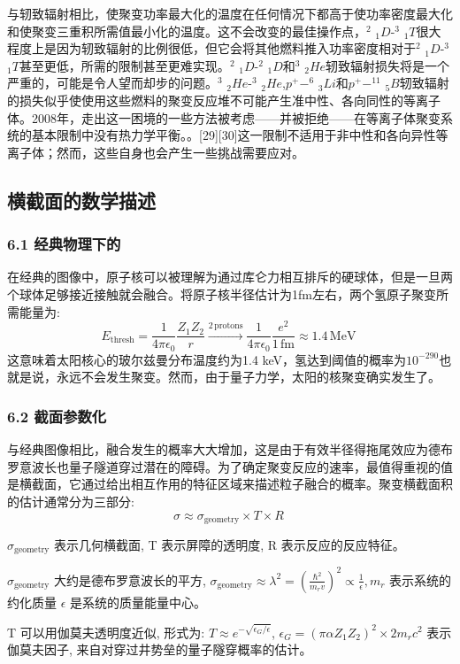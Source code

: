 与轫致辐射相比，使聚变功率最大化的温度在任何情况下都高于使功率密度最大化和使聚变三重积所需值最小化的温度。这不会改变的最佳操作点，$^{2}$ $_{1}D$-$^{3}$ $_{1}T$很大程度上是因为轫致辐射的比例很低，但它会将其他燃料推入功率密度相对于$^{2}$ $_{1}D$-$^{3}$ $_{1}T$甚至更低，所需的限制甚至更难实现。$^{2}$ $_{1}D$-$^{2}$ $_{1}D$和$^{3}$ $_{2}He$轫致辐射损失将是一个严重的，可能是令人望而却步的问题。$^{3}$ $_{2}He$-$^{3}$ $_{2}He$,$p^{+}-^{6}$ $_{3}Li$和$p^{+}-^{11}$ $_{5}B$轫致辐射的损失似乎使使用这些燃料的聚变反应堆不可能产生准中性、各向同性的等离子体。2008年，走出这一困境的一些方法被考虑——并被拒绝——在等离子体聚变系统的基本限制中没有热力学平衡。。[29][30]这一限制不适用于非中性和各向异性等离子体；然而，这些自身也会产生一些挑战需要应对。

\subsection{ 横截面的数学描述}
\subsubsection{6.1 经典物理下的}
在经典的图像中，原子核可以被理解为通过库仑力相互排斥的硬球体，但是一旦两个球体足够接近接触就会融合。将原子核半径估计为1fm左右，两个氢原子聚变所需能量为:
$$E_{\text{thresh}} = \frac{1}{4\pi \epsilon_0} \frac{Z_1 Z_2}{r} \xrightarrow{2 \, \text{protons}} \frac{1}{4\pi \epsilon_0} \frac{e^2}{1 \, \text{fm}} \approx 1.4 \, \text{MeV}~$$
这意味着太阳核心的玻尔兹曼分布温度约为1.4 keV，氢达到阈值的概率为$10^{-290}$也就是说，永远不会发生聚变。然而，由于量子力学，太阳的核聚变确实发生了。
\subsubsection{6.2 截面参数化}
与经典图像相比，融合发生的概率大大增加，这是由于有效半径得拖尾效应为德布罗意波长也量子隧道穿过潜在的障碍。为了确定聚变反应的速率，最值得重视的值是横截面，它通过给出相互作用的特征区域来描述粒子融合的概率。聚变横截面积的估计通常分为三部分:
$$\sigma \approx \sigma_{\text{geometry}} \times T \times R~$$

$\sigma_{\text{geometry}}$ 表示几何横截面, T 表示屏障的透明度, R 表示反应的反应特征。

$\sigma_{\text{geometry}}$ 大约是德布罗意波长的平方, 
$\sigma_{\text{geometry}} \approx \lambda^2 = \left( \frac{\hbar^2}{m_r v} \right)^2 \propto \frac{1}{\epsilon}, 
m_r$ 表示系统的约化质量 $\epsilon$ 是系统的质量能量中心。

T 可以用伽莫夫透明度近似, 形式为: $T \approx e^{-\sqrt{\epsilon_G / \epsilon}}$, 
$\epsilon_G = \left( \pi \alpha Z_1 Z_2 \right)^2 \times 2 m_r c^2$ 表示伽莫夫因子, 来自对穿过井势垒的量子隧穿概率的估计。

